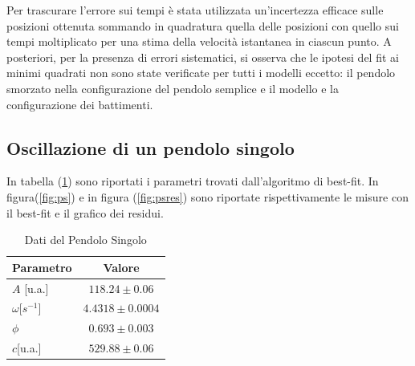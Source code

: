 \documentclass{article}
\begin{document}
    Per trascurare l'errore sui tempi è stata utilizzata un'incertezza efficace sulle posizioni ottenuta sommando in quadratura quella delle posizioni con quello sui tempi moltiplicato per una stima della velocità istantanea in ciascun punto.
    A posteriori, per la presenza di errori sistematici, si osserva che le ipotesi del fit ai minimi quadrati non sono state verificate per tutti i modelli eccetto: il pendolo smorzato nella configurazione del pendolo semplice e il modello e la configurazione dei battimenti.



                

            \subsection{ Oscillazione di un pendolo singolo}
              In tabella (\ref{tab:pendolosingolo}) sono riportati i parametri trovati dall'algoritmo di best-fit.
              In figura(\ref{fig:ps}) e in figura (\ref{fig:psres}) sono riportate rispettivamente  le misure con il best-fit e il grafico dei residui.



                \begin{table}[h! ]
                        \centering
                        \caption{Dati del Pendolo Singolo}
                        \begin{tabular}{|l|c|}
                        \hline
                        Parametro & Valore \\
                        \hline
                        $A$ [u.a.]& $118.24 \pm 0.06$ \\
                        $\omega$[$s^{-1}$] & $4.4318 \pm 0.0004$ \\
                        $\phi$ & $0.693 \pm 0.003$ \\
                        $c$[u.a.]  & $529.88 \pm 0.06$ \\
                        \hline
                        \end{tabular}
                        \label{tab:pendolosingolo}
                \end{table}
\end{document}
